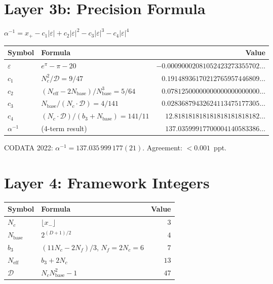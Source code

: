 \documentclass[11pt,a4paper]{article}
\begin{document}
\section*{Layer 3b: Precision Formula}

\noindent $\displaystyle\alpha^{-1} = x_+ - c_1|\varepsilon| + c_2|\varepsilon|^2 - c_3|\varepsilon|^3 - c_4|\varepsilon|^4$

\begin{longtable}{lp{5.5cm}r}
\toprule
\textbf{Symbol} & \textbf{Formula} & \textbf{Value} \\
\midrule
\endhead
$\varepsilon$ & $e^\pi - \pi - 20$ &
$-0.00090002081052423273355702\ldots$ \\[4pt]
$c_1$ & $N_c^2/\mathcal{D} = 9/47$ &
$0.19148936170212765957446809\ldots$ \\[4pt]
$c_2$ & $(N_{\mathrm{eff}}\!-\!2N_{\mathrm{base}})/N_{\mathrm{base}}^3 = 5/64$ &
$0.07812500000000000000000000\ldots$ \\[4pt]
$c_3$ & $N_{\mathrm{base}}/(N_c\!\cdot\!\mathcal{D}) = 4/141$ &
$0.02836879432624113475177305\ldots$ \\[4pt]
$c_4$ & $(N_c\!\cdot\!\mathcal{D})/(b_3\!+\!N_{\mathrm{base}}) = 141/11$ &
$12.818181818181818181818182\ldots$ \\[4pt]
$\alpha^{-1}$ & (4-term result) &
$137.03599917700004140583386\ldots$ \\
\bottomrule
\end{longtable}

\noindent CODATA 2022: $\alpha^{-1} = 137.035\,999\,177(21)$. \quad Agreement: $< 0.001$~ppt.

\section*{Layer 4: Framework Integers}

\begin{longtable}{lp{6.5cm}r}
\toprule
\textbf{Symbol} & \textbf{Formula} & \textbf{Value} \\
\midrule
\endhead
$N_c$ & $\lfloor x_- \rfloor$ & $3$ \\
$N_{\mathrm{base}}$ & $2^{(D+1)/2}$ & $4$ \\
$b_3$ & $(11N_c - 2N_f)/3$, \quad $N_f = 2N_c = 6$ & $7$ \\
$N_{\mathrm{eff}}$ & $b_3 + 2N_c$ & $13$ \\
$\mathcal{D}$ & $N_c N_{\mathrm{base}}^2 - 1$ & $47$ \\
\bottomrule
\end{longtable}
\end{document}
